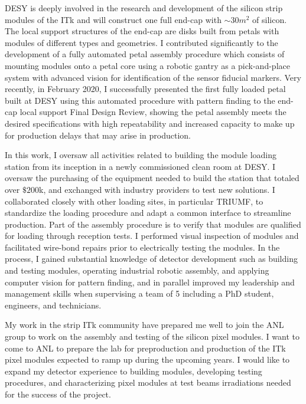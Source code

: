 \documentclass[a4paper]{article}
\begin{document}
DESY is deeply involved in the research and development of the silicon strip modules of the ITk and will construct one full end-cap
with $\sim 30 m^2$ of silicon. The local support structures of the end-cap are disks built from petals with modules of different types and geometries.
I contributed significantly to the development of a fully automated petal assembly procedure which consists of mounting modules onto a petal core using a robotic gantry as a pick-and-place system with advanced vision for identification of the sensor fiducial markers.
Very recently, in February 2020, I successfully presented the first fully loaded petal built at DESY using this automated procedure with pattern finding to the end-cap local support Final Design Review, showing the petal assembly meets the desired specifications with high repeatability and increased capacity to make up for production delays that may arise in production.

In this work, I oversaw all activities related to building the module loading station from its inception in a newly commissioned clean room at DESY. I oversaw the purchasing of the equipment needed to build the station that totaled over $\$200$k, and exchanged with industry providers to test new solutions. I collaborated closely with other loading sites, in particular TRIUMF, to standardize the loading procedure and adapt a common interface to streamline production. Part of the assembly procedure is to verify that modules are qualified for loading through reception tests. I performed visual inspection of modules and facilitated wire-bond repairs prior to electrically testing the modules.
In the process, I gained substantial knowledge of detector development such as building and testing modules, operating industrial robotic assembly, and applying computer vision for pattern finding, and in parallel improved my leadership and management skills when supervising a team of 5 including a PhD student, engineers, and technicians.

My work in the strip ITk community have prepared me well to join the ANL group to work on the assembly and testing of the silicon pixel modules. I want to come to ANL to prepare the lab for preproduction and production of the ITk pixel modules expected to ramp up during the upcoming years.
I would like to expand my detector experience to building modules, developing testing procedures, and characterizing pixel modules at test beams
irradiations needed for the success of the project.
\end{document}
